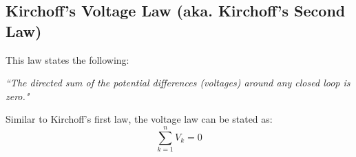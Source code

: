 \documentclass[12pt,a4paper,oneside]{article}
\begin{document}
\subsection{Kirchoff's Voltage Law (aka. Kirchoff's Second Law)}
This law states the following:
\begin{center}
	\textit{``The directed sum of the potential differences (voltages) around any closed loop is zero."}
\end{center}
Similar to Kirchoff's first law, the voltage law can be stated as:
\[
	\sum_{k=1}^n V_k = 0
\]
\end{document}
